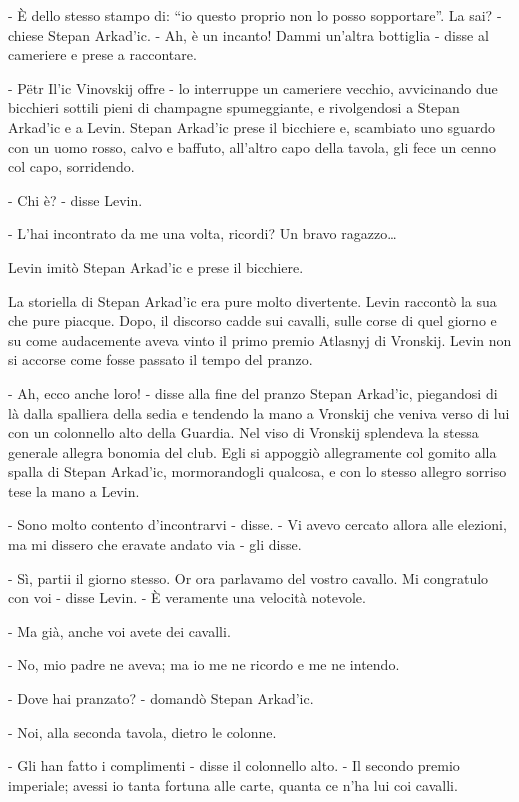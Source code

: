 - È dello stesso stampo di: ``io questo proprio non lo posso sopportare''. La sai? - chiese Stepan Arkad'ic. - Ah, è un incanto! Dammi un'altra bottiglia - disse al cameriere e prese a raccontare. 

- Pëtr Il'ic Vinovskij offre - lo interruppe un cameriere vecchio, avvicinando due bicchieri sottili pieni di champagne spumeggiante, e rivolgendosi a Stepan Arkad'ic e a Levin. Stepan Arkad'ic prese il bicchiere e, scambiato uno sguardo con un uomo rosso, calvo e baffuto, all'altro capo della tavola, gli fece un cenno col capo, sorridendo. 

- Chi è? - disse Levin. 

- L'hai incontrato da me una volta, ricordi? Un bravo ragazzo\ldots{} 

Levin imitò Stepan Arkad'ic e prese il bicchiere. 

La storiella di Stepan Arkad'ic era pure molto divertente. Levin raccontò la sua che pure piacque. Dopo, il discorso cadde sui cavalli, sulle corse di quel giorno e su come audacemente aveva vinto il primo premio Atlasnyj di Vronskij. Levin non si accorse come fosse passato il tempo del pranzo. 

- Ah, ecco anche loro! - disse alla fine del pranzo Stepan Arkad'ic, piegandosi di là dalla spalliera della sedia e tendendo la mano a Vronskij che veniva verso di lui con un colonnello alto della Guardia. Nel viso di Vronskij splendeva la stessa generale allegra bonomia del club. Egli si appoggiò allegramente col gomito alla spalla di Stepan Arkad'ic, mormorandogli qualcosa, e con lo stesso allegro sorriso tese la mano a Levin. 

- Sono molto contento d'incontrarvi - disse. - Vi avevo cercato allora alle elezioni, ma mi dissero che eravate andato via - gli disse. 

- Sì, partii il giorno stesso. Or ora parlavamo del vostro cavallo. Mi congratulo con voi - disse Levin. - È veramente una velocità notevole. 

- Ma già, anche voi avete dei cavalli. 

- No, mio padre ne aveva; ma io me ne ricordo e me ne intendo. 

- Dove hai pranzato? - domandò Stepan Arkad'ic. 

- Noi, alla seconda tavola, dietro le colonne. 

- Gli han fatto i complimenti - disse il colonnello alto. - Il secondo premio imperiale; avessi io tanta fortuna alle carte, quanta ce n'ha lui coi cavalli. 

